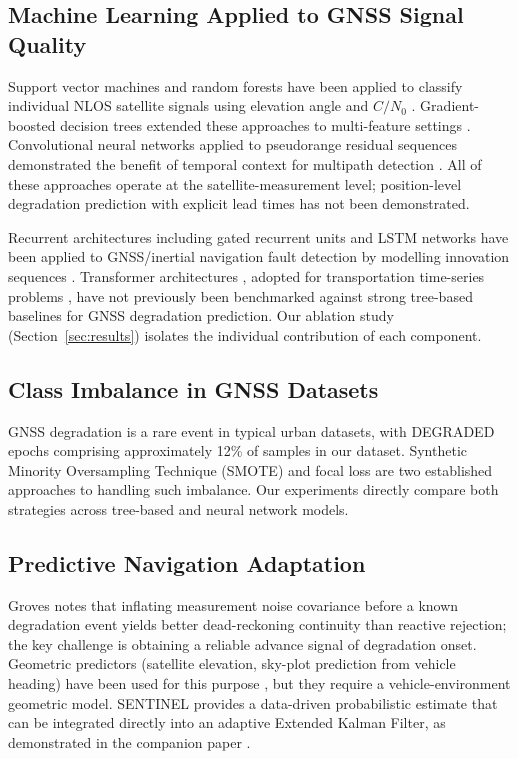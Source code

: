 \documentclass[pdflatex,sn-mathphys-num]{sn-jnl}
\begin{document}
\subsection{Machine Learning Applied to GNSS Signal Quality}

Support vector machines and random forests have been applied to classify
individual NLOS satellite signals using elevation angle and $C/N_0$
\cite{[AuthorYear_SVM_GNSS], [AuthorYear_RF_GNSS_NLOS]}.  Gradient-boosted
decision trees extended these approaches to multi-feature settings
\cite{[AuthorYear_XGB_GNSS_integrity]}.  Convolutional neural networks
applied to pseudorange residual sequences demonstrated the benefit of
temporal context for multipath detection
\cite{[AuthorYear_CNN_GNSS_temporal]}.  All of these approaches operate at
the satellite-measurement level; position-level degradation prediction with
explicit lead times has not been demonstrated.

Recurrent architectures including gated recurrent units and LSTM networks
have been applied to GNSS/inertial navigation fault detection by modelling
innovation sequences \cite{[AuthorYear_RNN_GNSS_INS]}.  Transformer
architectures \cite{[AuthorYear_Vaswani_2017]}, adopted for transportation
time-series problems \cite{[AuthorYear_Transformer_transport]}, have not
previously been benchmarked against strong tree-based baselines for
GNSS degradation prediction.  Our ablation study (Section~\ref{sec:results})
isolates the individual contribution of each component.

\subsection{Class Imbalance in GNSS Datasets}

GNSS degradation is a rare event in typical urban datasets, with DEGRADED
epochs comprising approximately 12\% of samples in our dataset.  Synthetic
Minority Oversampling Technique (SMOTE) \cite{[AuthorYear_SMOTE]} and focal
loss \cite{[AuthorYear_focal_loss_Lin2017]} are two established approaches
to handling such imbalance.  Our experiments directly compare both strategies
across tree-based and neural network models.

\subsection{Predictive Navigation Adaptation}

Groves \cite{[AuthorYear_Groves_2013]} notes that inflating measurement noise
covariance before a known degradation event yields better dead-reckoning
continuity than reactive rejection; the key challenge is obtaining a reliable
advance signal of degradation onset.  Geometric predictors (satellite
elevation, sky-plot prediction from vehicle heading) have been used for
this purpose \cite{[AuthorYear_geometric_prediction]}, but they require a
vehicle-environment geometric model.  SENTINEL provides a data-driven
probabilistic estimate that can be integrated directly into an adaptive
Extended Kalman Filter, as demonstrated in the companion paper
\cite{[AuthorYear_Paper_B_TITS]}.
\end{document}

